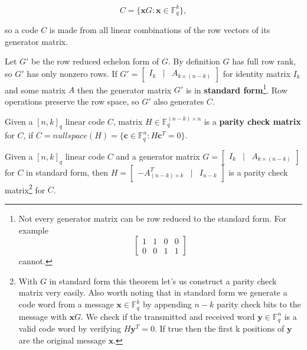 $$
C = \{\bm{x} G: \bm{x} \in \mathbb{F}_q^k\},
$$

\noindent so a code $C$ is made from all linear combinations of the row vectors of its generator matrix.

Let $G'$ be the row reduced echelon form of $G$. By definition $G$ has full row rank, so $G'$ has only nonzero rows. If 
$
G' = \left[\begin{smallmatrix}
I_k & | & A_{k \times (n - k)}
\end{smallmatrix}\right]
$ 
for identity matrix $I_k$ and some matrix $A$ then the generator matrix $G'$ is in \textbf{standard form}\footnote{Not every generator matrix can be row reduced to the standard form. For example 
$$
\begin{bmatrix}
1 & 1 & 0 & 0 \\
0 & 0 & 1 & 1 
\end{bmatrix}
$$
cannot.}. Row operations preserve the row space, so $G'$ also generates $C$.

\begin{defn}\label{parityCheckDef}
Given a $[n, k]_q$ linear code $C$, matrix $H \in \mathbb{F}_q^{(n-k) \times n}$ is a \textbf{parity check matrix} for $C$, if $C = nullspace(H)=\{\bm{c} \in \mathbb{F}_q^n: H \bm{c}^T = 0\}$.
\end{defn}

\begin{thm}\label{generatorParityCheckRel}
Given a $[n, k]_q$ linear code $C$ and a generator matrix $
G = \left[\begin{smallmatrix}
I_k & | & A_{k \times (n - k)}
\end{smallmatrix}\right]
$ for $C$ in standard form, then $
H = \left[\begin{smallmatrix}
-A^T_{(n - k) \times k} & | & I_{n - k}
\end{smallmatrix}\right]
$ is a parity check matrix\footnote{With $G$ in standard form this theorem let's us construct a parity check matrix very easily. Also worth noting that in standard form we generate a code word from a message $\bm{x} \in \mathbb{F}_q^k$ by appending $n - k$ parity check bits to the message with $\bm{x} G$. We check if the transmitted and received word $\bm{y} \in \mathbb{F}_q^n$ is a valid code word by verifying $H \bm{y}^T = 0$. If true then the first k positions of $\bm{y}$ are the original message $\bm{x}$.} for $C$.
\end{thm}

